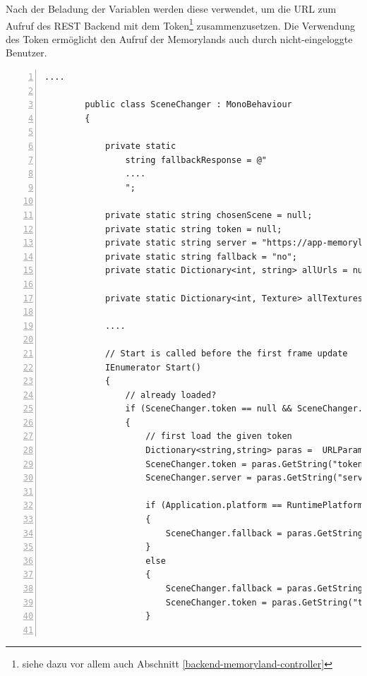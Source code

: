 Nach der Beladung der Variablen werden diese verwendet, um die URL zum Aufruf des REST Backend mit dem Token\footnote{siehe dazu vor allem auch Abschnitt \ref{backend-memoryland-controller}} zusammenzusetzen. Die Verwendung des Token ermöglicht den Aufruf der Memorylands auch durch nicht-eingeloggte Benutzer.



\begin{lstlisting}[numbers=left,caption={SceneChanger - Start},label={lst:unity-scene-changer-start}]
        ....
        
        public class SceneChanger : MonoBehaviour
        {
        
            private static 
                string fallbackResponse = @"
                ....
                ";
        
            private static string chosenScene = null;
            private static string token = null;
            private static string server = "https://app-memoryland.azurewebsites.net";
            private static string fallback = "no";
            private static Dictionary<int, string> allUrls = null;
        
            private static Dictionary<int, Texture> allTextures = new Dictionary<int, Texture> ();
        
            ....                
        
            // Start is called before the first frame update
            IEnumerator Start()
            {
                // already loaded?
                if (SceneChanger.token == null && SceneChanger.chosenScene == null) 
                {
                    // first load the given token
                    Dictionary<string,string> paras =  URLParameters.GetSearchParameters();
                    SceneChanger.token = paras.GetString("token", "");
                    SceneChanger.server = paras.GetString("server", "https://app-memoryland.azurewebsites.net");
                    
                    if (Application.platform == RuntimePlatform.WebGLPlayer)
                    {
                        SceneChanger.fallback = paras.GetString("fallback", "no");
                    }
                    else
                    {
                        SceneChanger.fallback = paras.GetString("fallback", "no");
                        SceneChanger.token = paras.GetString("token", "1920cf9e-b295-4c80-b347-75eff21a71f6");
                    }
                    

\end{lstlisting}
